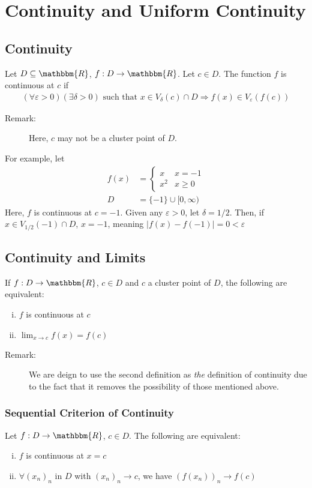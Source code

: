 \documentclass[10pt]{extarticle}
\newcommand{\R}{\mathbbm{R}}
\begin{document}
  \section{Continuity and Uniform Continuity}%
  \subsection{Continuity}%
    Let $D\subseteq \R$, $f: D\rightarrow \R$. Let $c\in D$. The function $f$ is continuous at $c$ if
    \begin{align*}
      (\forall \varepsilon > 0)(\exists \delta > 0) \text{ such that } x\in V_{\delta}(c) \cap D \Rightarrow f(x) \in V_{\varepsilon}(f(c))
    \end{align*}
    \begin{description}
      \item[Remark:] Here, $c$ may not be a cluster point of $D$.
    \end{description}
    For example, let
    \begin{align*}
      f(x) &= \begin{cases}
        x & x = -1\\
        x^2 & x \geq 0
      \end{cases}\\
        D &= \{-1\} \cup [0,\infty)
    \end{align*}
    Here, $f$ is continuous at $c = -1$. Given any $\varepsilon > 0$, let $\delta = 1/2$. Then, if $x\in V_{1/2}(-1)\cap D$, $x = -1$, meaning $|f(x) - f(-1)| = 0 < \varepsilon$
  \subsection{Continuity and Limits}%
    If $f: D\rightarrow \R$, $c\in D$ and $c$ a cluster point of $D$, the following are equivalent:
    \begin{enumerate}[(i)]
      \item $f$ is continuous at $c$
      \item $\lim_{x\rightarrow c} f(x) = f(c)$
    \end{enumerate}
    \begin{description}
      \item[Remark:] We are deign to use the second definition as \textit{the} definition of continuity due to the fact that it removes the possibility of those mentioned above.
    \end{description}
  \subsubsection{Sequential Criterion of Continuity}%
    Let $f:D\rightarrow \R$, $c\in D$. The following are equivalent:
    \begin{enumerate}[(i)]
      \item $f$ is continuous at $x = c$
      \item $\forall (x_n)_n$ in $D$ with $(x_n)_n \rightarrow c$, we have $(f(x_n))_n \rightarrow f(c)$
    \end{enumerate}
\end{document}
